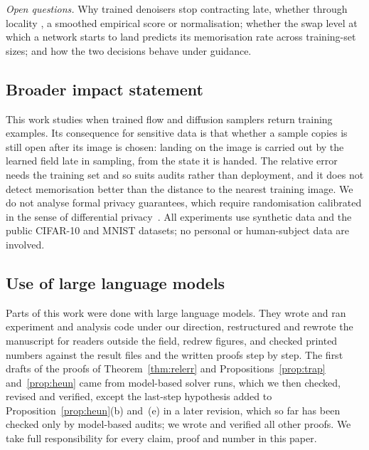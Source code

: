 \documentclass{article} %
\theoremstyle{plain}
\theoremstyle{definition}
\theoremstyle{remark}
\begin{document}
\emph{Open questions.} Why trained denoisers stop contracting late, whether through locality
\citep{kamb2024creativity,niedoba2024mechanistic}, a smoothed empirical score
\citep{scarvelis2025closedform,chen2026scoresmoothing} or normalisation; whether the swap level at which
a network starts to land predicts its memorisation rate across training-set sizes; and how the two
decisions behave under guidance.

\subsection*{Broader impact statement}
This work studies when trained flow and diffusion samplers return training examples. Its
consequence for sensitive data is that whether a sample copies is still open after its image is
chosen: landing on the image is carried out by the learned field late in sampling, from the state
it is handed.
The relative error needs the training set and so suits audits rather than
deployment, and it does not detect memorisation better than the distance to the nearest training
image. We do not analyse formal privacy guarantees, which require randomisation calibrated in the
sense of differential privacy~\citep{dwork2014algorithmic}. All experiments use synthetic data and
the public CIFAR-10 and MNIST datasets; no personal or human-subject data are involved.

\subsection*{Use of large language models}
Parts of this work were done with large language models. They wrote and ran experiment and
analysis code under our direction, restructured and rewrote the manuscript for readers outside the
field, redrew figures, and checked printed numbers against the result files and the written proofs
step by step. The first drafts of the proofs of Theorem~\ref{thm:relerr} and
Propositions~\ref{prop:trap} and~\ref{prop:heun} came from model-based solver runs, which we then
checked, revised and verified, except the last-step hypothesis added to
Proposition~\ref{prop:heun}(b) and~(e) in a later revision, which so far has been checked only by
model-based audits; we wrote and verified all other proofs. We take full responsibility
for every claim, proof and number in this paper.
\end{document}
